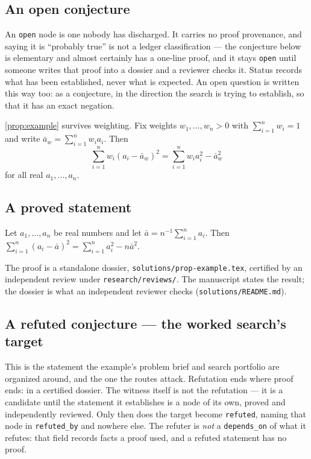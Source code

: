 \documentclass[../../main.tex]{subfiles}
\begin{document}
\subsection{An open conjecture}

An \texttt{open} node is one nobody has discharged. It carries no proof provenance,
and saying it is ``probably true'' is not a ledger classification --- the conjecture
below is elementary and almost certainly has a one-line proof, and it stays
\texttt{open} until someone writes that proof into a dossier and a reviewer checks
it. Status records what has been established, never what is expected. An open
question is written this way too: as a conjecture, in the direction the search is
trying to establish, so that it has an exact negation.

\begin{conjecture}
\label{conj:weighted-example}
  \ref{prop:example} survives weighting. Fix weights $w_1,\dots,w_n > 0$ with
  $\sum_{i=1}^n w_i = 1$ and write $\bar a_w = \sum_{i=1}^n w_i a_i$. Then
  \[
    \sum_{i=1}^n w_i (a_i - \bar a_w)^2 = \sum_{i=1}^n w_i a_i^2 - \bar a_w^2
  \]
  for all real $a_1,\dots,a_n$.
\end{conjecture}

\subsection{A proved statement}

\begin{proposition}
\label{prop:example}
  Let $a_1,\dots,a_n$ be real numbers and let $\bar a = n^{-1}\sum_{i=1}^n a_i$.
  Then $\sum_{i=1}^n (a_i - \bar a)^2 = \sum_{i=1}^n a_i^2 - n \bar a^2$.
\end{proposition}

The proof is a standalone dossier, \texttt{solutions/prop-example.tex}, certified
by an independent review under \texttt{research/reviews/}. The manuscript states
the result; the dossier is what an independent reviewer checks
(\texttt{solutions/README.md}).

\subsection{A refuted conjecture --- the worked search's target}

This is the statement the example's problem brief and search portfolio are organized
around, and the one the routes attack. Refutation ends where proof ends: in a
certified dossier. The witness itself is
not the refutation --- it is a candidate until the statement it establishes is a
node of its own, proved and independently reviewed. Only then does the target
become \texttt{refuted}, naming that node in \texttt{refuted\_by} and nowhere
else. The refuter is \emph{not} a \texttt{depends\_on} of what it refutes: that
field records facts a proof used, and a refuted statement has no proof.
\end{document}
